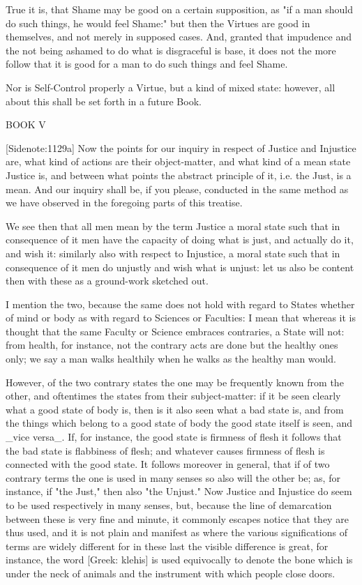True it is, that Shame may be good on a certain supposition, as "if a
man should do such things, he would feel Shame:" but then the Virtues
are good in themselves, and not merely in supposed cases. And, granted
that impudence and the not being ashamed to do what is disgraceful is
base, it does not the more follow that it is good for a man to do such
things and feel Shame.

Nor is Self-Control properly a Virtue, but a kind of mixed state:
however, all about this shall be set forth in a future Book.




BOOK V

[Sidenote:1129a] Now the points for our inquiry in respect of Justice
and Injustice are, what kind of actions are their object-matter, and
what kind of a mean state Justice is, and between what points the
abstract principle of it, i.e. the Just, is a mean. And our inquiry
shall be, if you please, conducted in the same method as we have
observed in the foregoing parts of this treatise.

We see then that all men mean by the term Justice a moral state such
that in consequence of it men have the capacity of doing what is
just, and actually do it, and wish it: similarly also with respect to
Injustice, a moral state such that in consequence of it men do unjustly
and wish what is unjust: let us also be content then with these as a
ground-work sketched out.

I mention the two, because the same does not hold with regard to States
whether of mind or body as with regard to Sciences or Faculties: I mean
that whereas it is thought that the same Faculty or Science embraces
contraries, a State will not: from health, for instance, not the
contrary acts are done but the healthy ones only; we say a man walks
healthily when he walks as the healthy man would.

However, of the two contrary states the one may be frequently known from
the other, and oftentimes the states from their subject-matter: if it be
seen clearly what a good state of body is, then is it also seen what a
bad state is, and from the things which belong to a good state of body
the good state itself is seen, and _vice versa_. If, for instance,
the good state is firmness of flesh it follows that the bad state is
flabbiness of flesh; and whatever causes firmness of flesh is connected
with the good state. It follows moreover in general, that if of two
contrary terms the one is used in many senses so also will the other be;
as, for instance, if "the Just," then also "the Unjust." Now Justice and
Injustice do seem to be used respectively in many senses, but, because
the line of demarcation between these is very fine and minute, it
commonly escapes notice that they are thus used, and it is not plain
and manifest as where the various significations of terms are widely
different for in these last the visible difference is great, for
instance, the word [Greek: klehis] is used equivocally to denote the
bone which is under the neck of animals and the instrument with which
people close doors.

